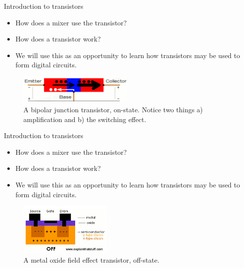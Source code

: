 \documentclass{beamer}
\begin{document}
\begin{frame}{Introduction to transistors}
\begin{itemize}
\item How does a mixer use the transistor?
\item \alert{How does a transistor work?}
\item We will use this as an opportunity to learn how transistors may be used to form digital circuits.
\end{itemize}
\begin{figure}
\centering
\includegraphics[width=0.5\textwidth]{figures/transistor3.png}
\caption{\label{fig:transistor3} A bipolar junction transistor, on-state.  Notice two things a) amplification and b) the switching effect.}
\end{figure}
\end{frame}

\begin{frame}{Introduction to transistors}
\begin{itemize}
\item How does a mixer use the transistor?
\item \alert{How does a transistor work?}
\item We will use this as an opportunity to learn how transistors may be used to form digital circuits.
\end{itemize}
\begin{figure}
\centering
\includegraphics[width=0.4\textwidth]{figures/mosfet1.png}
\caption{\label{fig:mosfet1} A metal oxide field effect transistor, off-state.}
\end{figure}
\end{frame}
\end{document}

